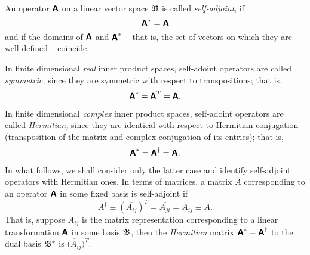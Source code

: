 An operator    $\textsf{\textbf{A}}$   on a linear vector space   ${\frak V}$
is called {\em self-adjoint}, if
\begin{equation}
\textsf{\textbf{A}}^{\ast}=
\textsf{\textbf{A}}
\end{equation}
and if the domains of $\textsf{\textbf{A}}$ and $\textsf{\textbf{A}}^{\ast}$
-- that is, the set of vectors on which they are well defined -- coincide.

In finite dimensional {\em real} inner product spaces,
self-adoint operators are called {\em symmetric,}
since they are symmetric with respect to transpositions; that is,
\begin{equation}
\textsf{\textbf{A}}^{\ast}= \textsf{\textbf{A}}^{T}=
\textsf{\textbf{A}}.
\end{equation}

In finite dimensional
{\em complex} inner product spaces,
self-adoint operators are called {\em Hermitian,}
since they are identical with respect to Hermitian conjugation (transposition of the matrix and complex conjugation of its
entries); that is,
\begin{equation}
\textsf{\textbf{A}}^{\ast}= \textsf{\textbf{A}}^{\dagger}=
\textsf{\textbf{A}}.
\end{equation}

In what follows, we shall consider only the latter case and identify self-adjoint operators with Hermitian ones.
In terms of matrices, a matrix $A$ corresponding to an operator $\textsf{\textbf{A}}$ in
some fixed basis is self-adjoint
if
\begin{equation}
A^{\dagger}\equiv (\overline{A_{ij}})^T=  \overline{A_{ji}} =A_{ij} \equiv A.
\end{equation}
That is, suppose $A_{ij}$ is the matrix representation
corresponding to a linear transformation $\textsf{\textbf{A}}$  in some basis ${\frak B}$,
then the {\em Hermitian} matrix $\textsf{\textbf{A}}^\ast = \textsf{\textbf{A}}^\dagger$
to the dual basis
${\frak B}^*$
is
$\overline{(A_{ij}})^T$.



